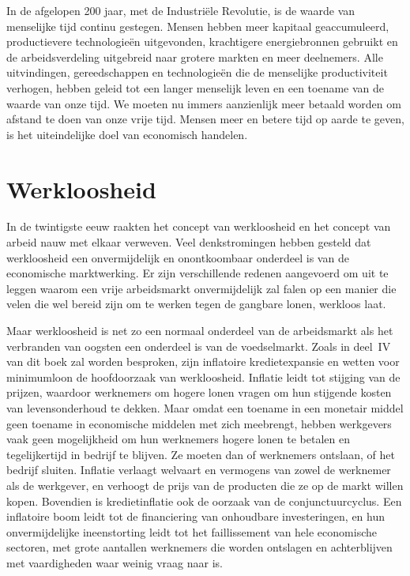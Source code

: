 In de afgelopen 200 jaar, met de Industriële Revolutie, is de waarde van
menselijke tijd continu gestegen. Mensen hebben meer kapitaal
geaccumuleerd, productievere technologieën uitgevonden, krachtigere
energiebronnen gebruikt en de arbeidsverdeling uitgebreid naar grotere
markten en meer deelnemers. Alle uitvindingen, gereedschappen en
technologieën die de menselijke productiviteit verhogen, hebben geleid
tot een langer menselijk leven en een toename van de waarde van onze
tijd. We moeten nu immers aanzienlijk meer betaald worden om afstand te
doen van onze vrije tijd. Mensen meer en betere tijd op aarde te geven,
is het uiteindelijke doel van economisch handelen.

\section{Werkloosheid}

In de twintigste eeuw raakten het concept van werkloosheid en het
concept van arbeid nauw met elkaar verweven. Veel denkstromingen hebben
gesteld dat werkloosheid een onvermijdelijk en onontkoombaar onderdeel
is van de economische marktwerking. Er zijn verschillende redenen
aangevoerd om uit te leggen waarom een vrije arbeidsmarkt onvermijdelijk
zal falen op een manier die velen die wel bereid zijn om te werken tegen
de gangbare lonen, werkloos laat.

Maar werkloosheid is net zo een normaal onderdeel van de arbeidsmarkt
als het verbranden van oogsten een onderdeel is van de voedselmarkt.
Zoals in deel~IV van dit boek zal worden besproken, zijn inflatoire
kredietexpansie en wetten voor minimumloon de hoofdoorzaak van
werkloosheid. Inflatie leidt tot stijging van de prijzen, waardoor
werknemers om hogere lonen vragen om hun stijgende kosten van
levensonderhoud te dekken. Maar omdat een toename in een monetair middel
geen toename in economische middelen met zich meebrengt, hebben
werkgevers vaak geen mogelijkheid om hun werknemers hogere lonen te
betalen en tegelijkertijd in bedrijf te blijven. Ze moeten dan of
werknemers ontslaan, of het bedrijf sluiten. Inflatie verlaagt welvaart
en vermogens van zowel de werknemer als de werkgever, en verhoogt de
prijs van de producten die ze op de markt willen kopen. Bovendien is
kredietinflatie ook de oorzaak van de conjunctuurcyclus. Een inflatoire
boom leidt tot de financiering van onhoudbare investeringen, en hun
onvermijdelijke ineenstorting leidt tot het faillissement van hele
economische sectoren, met grote aantallen werknemers die worden
ontslagen en achterblijven met vaardigheden waar weinig vraag naar is.

